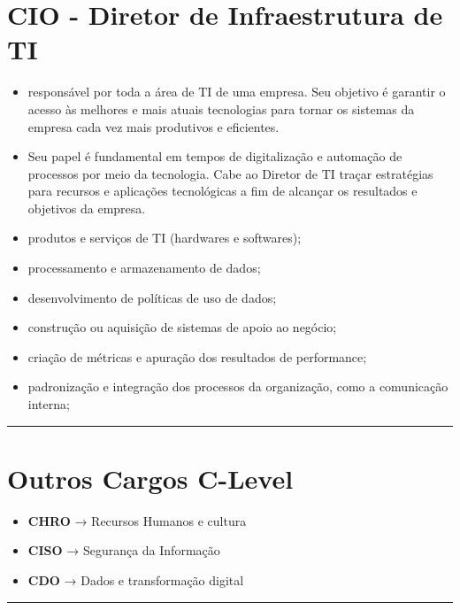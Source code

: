 \documentclass[
]{book}
\providecommand{\tightlist}{%
  \setlength{\itemsep}{0pt}\setlength{\parskip}{0pt}}
\begin{document}
\section{\texorpdfstring{\textbf{CIO} - Diretor de Infraestrutura de TI}{CIO - Diretor de Infraestrutura de TI}}\label{cio---diretor-de-infraestrutura-de-ti}

\begin{itemize}
\item
  responsável por toda a área de TI de uma empresa. Seu objetivo é garantir o acesso às melhores e mais atuais tecnologias para tornar os sistemas da empresa cada vez mais produtivos e eficientes.
\item
  Seu papel é fundamental em tempos de digitalização e automação de processos por meio da tecnologia. Cabe ao Diretor de TI traçar estratégias para recursos e aplicações tecnológicas a fim de alcançar os resultados e objetivos da empresa.
\item
  produtos e serviços de TI (hardwares e softwares);
\item
  processamento e armazenamento de dados;
\item
  desenvolvimento de políticas de uso de dados;
\item
  construção ou aquisição de sistemas de apoio ao negócio;
\item
  criação de métricas e apuração dos resultados de performance;
\item
  padronização e integração dos processos da organização, como a comunicação interna;
\end{itemize}

\begin{center}\rule{0.5\linewidth}{0.5pt}\end{center}

\section{Outros Cargos C-Level}\label{outros-cargos-c-level}

\begin{itemize}
\tightlist
\item
  \textbf{CHRO} → Recursos Humanos e cultura
\item
  \textbf{CISO} → Segurança da Informação
\item
  \textbf{CDO} → Dados e transformação digital
\end{itemize}

\begin{center}\rule{0.5\linewidth}{0.5pt}\end{center}
\end{document}
